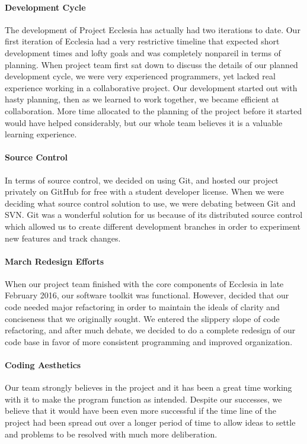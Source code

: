 \documentclass[letterpaper, 10pt]{article}
\begin{document}
	\paragraph{Development Cycle}
	The development of Project Ecclesia has actually had two iterations to date. Our first iteration of Ecclesia had a very restrictive timeline that expected short development times and lofty goals and was completely nonpareil in terms of planning. When project team first sat down to discuss the details of our planned development cycle, we were very experienced programmers, yet lacked real experience working in a collaborative project. Our development started out with hasty planning, then as we learned to work together, we became efficient at collaboration. More time allocated to the planning of the project before it started would have helped considerably, but our whole team believes it is a valuable learning experience.
	
	\paragraph{Source Control}
	In terms of source control, we decided on using Git, and hosted our project privately on GitHub for free with a student developer license. When we were deciding what source control solution to use, we were debating between Git and SVN. Git was a wonderful solution for us because of its distributed source control which allowed us to create different development branches in order to experiment new features and track changes.
	
	\paragraph{March Redesign Efforts}
	When our project team finished with the core components of Ecclesia in late February 2016, our software toolkit was functional. However, decided that our code needed major refactoring in order to maintain the ideals of clarity and conciseness that we originally sought. We entered the slippery slope of code refactoring, and after much debate, we decided to do a complete redesign of our code base in favor of more consistent programming and improved organization.
	
	\paragraph{Coding Aesthetics}
	Our team strongly believes in the project and it has been a great time working with it to make the program function as intended. Despite our successes, we believe that it would have been even more successful if the time line of the project had been spread out over a longer period of time to allow ideas to settle and problems to be resolved with much more deliberation.
	
\end{document}
